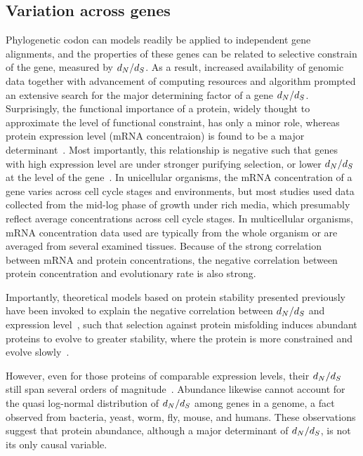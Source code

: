 \subsection{Variation across genes}

Phylogenetic codon can models readily be applied to independent gene alignments, and the properties of these genes can be related to selective constrain of the gene, measured by $d_N / d_S$.
As a result, increased availability of genomic data together with advancement of computing resources and algorithm prompted an extensive search for the major determining factor of a gene $d_N / d_S$.
Surprisingly, the functional importance of a protein, widely thought to approximate the level of functional constraint, has only a minor role, whereas protein expression level (mRNA concentraion) is found to be a major determinant~\citep{Zhang2015}.
Most importantly, this relationship is negative such that genes with high expression level are under stronger purifying selection, or lower $d_N / d_S$ at the level of the gene~\citep{Duret2000, Drummond2005a, Zhang2015}.
In unicellular organisms, the mRNA concentration of a gene varies across cell cycle stages and environments, but most studies used data collected from the mid-log phase of growth under rich media, which presumably reflect average concentrations across cell cycle stages.
In multicellular organisms, mRNA concentration data used are typically from the whole organism or are averaged from several examined tissues.
Because of the strong correlation between mRNA and protein concentrations, the negative correlation between protein concentration and evolutionary rate is also strong.

Importantly, theoretical models based on protein stability presented previously have been invoked to explain the negative correlation between $d_N / d_S$ and expression level~\citep{Wilke2006, Drummond2008}, such that selection against protein misfolding induces abundant proteins to evolve to greater stability, where the protein is more constrained and evolve slowly~\citep{Serohijos2012}.

However, even for those proteins of comparable expression levels, their $d_N / d_S$ still span several orders of magnitude~\citep{Drummond2008}.
Abundance likewise cannot account for the quasi log-normal distribution of $d_N / d_S$ among genes in a genome, a fact observed from bacteria, yeast, worm, fly, mouse, and humans.
These observations suggest that protein abundance, although a major determinant of $d_N / d_S$, is not its only causal variable.

